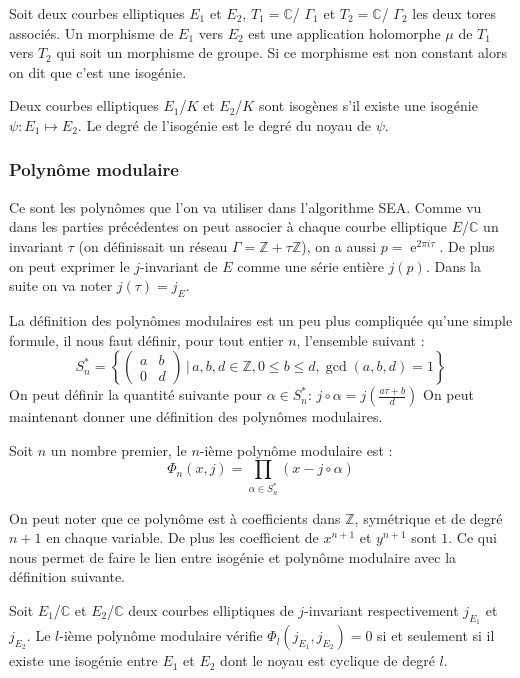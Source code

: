 \documentclass[12pt]{article}
\DeclareMathOperator{\e}{e}
\begin{document}
\begin{defi}
Soit deux courbes elliptiques $E_1$ et $E_2$, $T_1=\mathbb{C}$/ $\Gamma_1$ et $T_2 = \mathbb{C}$/ $\Gamma_2$ les deux tores associés. Un morphisme de $E_1$ vers $E_2$ est une application holomorphe $\mu$ de $T_1$ vers $T_2$ qui soit un morphisme de groupe. Si ce morphisme est non constant alors on dit que c'est une isogénie.
\end{defi}

Deux courbes elliptiques $E_1$/$K$ et $E_2$/$K$ sont isogènes s'il existe une isogénie $\psi : E_1 \mapsto E_2$. Le degré de l’isogénie est le degré du noyau de $\psi$.


\subsubsection{Polynôme modulaire}
Ce sont les polynômes que l'on va utiliser dans l'algorithme SEA. Comme vu dans les parties précédentes on peut associer à chaque courbe elliptique $E$/$\mathbb{C}$ un invariant $\tau$ (on définissait un réseau $\Gamma = \mathbb{Z}+\tau \mathbb{Z}$), on a aussi $p=\e^{2\pi i \tau}$. De plus on peut exprimer le $j$-invariant de $E$ comme une série entière $j(p)$. Dans la suite on va noter $j(\tau) = j_E$.

La définition des polynômes modulaires est un peu plus compliquée qu'une simple formule, il nous faut définir, pour tout entier $n$, l'ensemble suivant : 
\begin{equation*}
S_n^* = \left\{ \begin{pmatrix}
a & b\\
0 & d
\end{pmatrix}
\, | \, a,b,d \in \mathbb{Z}, 0 \leq b \leq d, \gcd(a,b,d) = 1
 \right\} 
\end{equation*}
On peut définir la quantité suivante pour $\alpha \in S_n^* $:  $j \circ \alpha = j(\frac{a\tau +b}{d})$
On peut maintenant donner une définition des polynômes modulaires.

\begin{defi}
Soit $n$ un nombre premier, le $n$-ième polynôme modulaire est :
\begin{equation*}
\Phi_n(x,j) = \prod_{\alpha \in S_n^*} (x - j \circ \alpha)
\end{equation*}
\end{defi}
On peut noter que ce polynôme est à coefficients dans $\mathbb{Z}$, symétrique et de degré $n+1$ en chaque variable. De plus les coefficient de $x^{n+1}$ et $y^{n+1}$ sont $1$.
Ce qui nous permet de faire le lien entre isogénie et polynôme modulaire avec la définition suivante.
\begin{defi}
Soit $E_1$/$\mathbb{C}$ et $E_2$/$\mathbb{C}$ deux courbes elliptiques de $j$-invariant respectivement $j_{E_1}$ et $j_{E_2}$. Le $l$-ième polynôme modulaire vérifie $\Phi_l(j_{E_1},j_{E_2}) = 0$ si et seulement si il existe une isogénie entre $E_1$ et $E_2$ dont le noyau est cyclique de degré $l$.
\end{defi}
\end{document}
